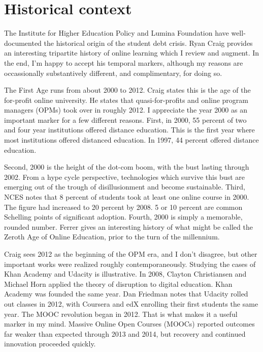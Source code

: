 \documentclass[review]{elsarticle}
\begin{document}
    \section{Historical context}

    The Institute for Higher Education Policy and Lumina Foundation have well-documented the historical origin of the student debt crisis\cite{foundation_2017}.
    Ryan Craig provides an interesting tripartite history of online learning which I review and augment. In the end, I'm happy to accept his temporal markers,
    although my reasons are occassionally substantively different, and complimentary, for doing so.
    
    The First Age runs from about 2000 to 2012. Craig states this is the age of the for-profit online university.
    He states that quasi-for-profits and online program managers (OPMs) took over in roughly 2012.
    I appreciate the year 2000 as an important marker for a few different reasons.
    First, in 2000, 55 percent of two and four year institutions offered distance education\cite{tabs2003distance}.
    This is the first year where most institutions offered distanced education.
    In 1997, 44 percent offered distance education\cite{sikora2002profile}.

    Second, 2000 is the height of the dot-com boom, with the bust lasting through 2002\cite{wollscheid2012rise}.
    From a hype cycle perspective, technologies which survive this bust are emerging out of the trough of disillusionment and become sustainable.
    Third, NCES notes that 8 percent of students took at least one online course in 2000\cite{radford2011learning}.
    The figure had increased to 20 percent by 2008.
    5 or 10 percent are common Schelling points of significant adoption.
    Fourth, 2000 is simply a memorable, rounded number.
    Ferrer gives an interesting history of what might be called the Zeroth Age of Online Education, prior to the turn of the millennium\cite{ferrer_2019}.

    Craig sees 2012 as the beginning of the OPM era, and I don't disagree, but other important works were realized roughly contemporaneously.
    Studying the cases of Khan Academy and Udacity is illustrative.
    In 2008, Clayton Christiansen and Michael Horn applied the theory of disruption to digital education\cite{horn2008disrupting}.
    Khan Academy was founded the same year\cite{tucker_2018}.
    Dan Friedman\cite{friedman2014mooc} notes that Udacity rolled out classes in 2012, with Coursera and edX enrolling their first students the same year.
    The MOOC revolution began in 2012. That is what makes it a useful marker in my mind.
    Massive Online Open Courses (MOOCs) reported outcomes far weaker than expected through 2013 and 2014, but recovery and continued innovation proceeded quickly.
\end{document}
